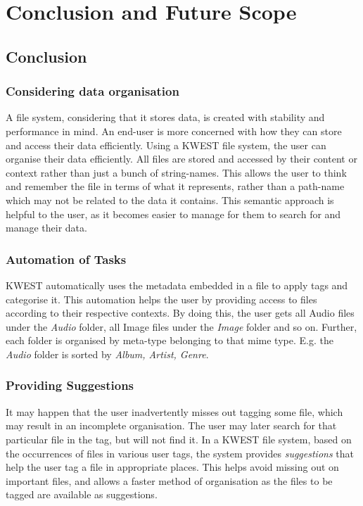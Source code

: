 \chapter{Conclusion and Future Scope}

\section{Conclusion}

\subsection*{Considering data organisation}
A file system, considering that it stores data, is created with stability and performance in mind. An end-user is more concerned with how they can store and access their data efficiently. Using a KWEST file system, the user can organise their data efficiently. All files are stored and accessed by their content or context rather than just a bunch of string-names. This allows the user to think and remember the file in terms of what it represents, rather than a path-name which may not be related to the data it contains. This semantic approach is helpful to the user, as it becomes easier to manage for them to search for and manage their data.

\subsection*{Automation of Tasks}
KWEST automatically uses the metadata embedded in a file to apply tags and categorise it. This automation helps the user by providing access to files according to their respective contexts. By doing this, the user gets all Audio files under the \textit{Audio} folder, all Image files under the \textit{Image} folder and so on. Further, each folder is organised by meta-type belonging to that mime type. E.g. the \textit{Audio} folder is sorted by \textit{Album, Artist, Genre}.

\subsection*{Providing Suggestions}
It may happen that the user inadvertently misses out tagging some file, which may result in an incomplete organisation. The user may later search for that particular file in the tag, but will not find it. In a KWEST file system, based on the occurrences of files in various user tags, the system provides \textit{suggestions} that help the user tag a file in appropriate places. This helps avoid missing out on important files, and allows a faster method of organisation as the files to be tagged are available as suggestions.

